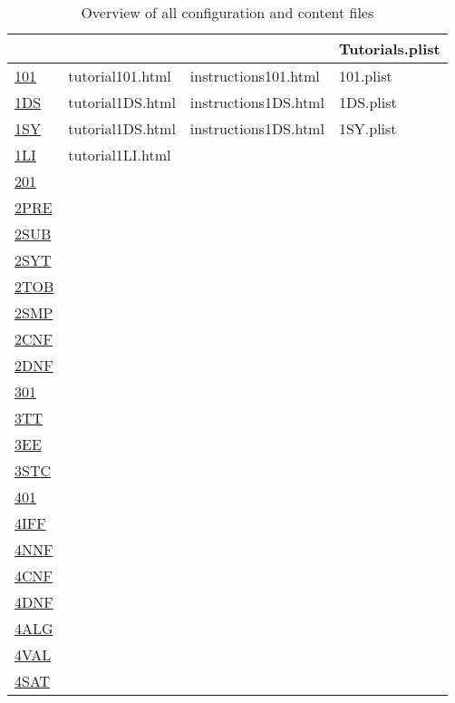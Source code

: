 \begin{table}[htdp]
\begin{center}
\begin{tabular}{llll}
&&&Tutorials.plist \\
\hline
\hline
\hyperref[tut:101]{101} & tutorial101.html & instructions101.html & 101.plist \\
\hyperref[tut:1DS]{1DS} & tutorial1DS.html & instructions1DS.html & 1DS.plist \\
\hyperref[tut:1SY]{1SY} & tutorial1DS.html & instructions1DS.html & 1SY.plist \\
\hyperref[tut:1LI]{1LI} & tutorial1LI.html & & \\
\hline
\hyperref[tut:201]{201} & \\
\hyperref[tut:2PRE]{2PRE} & \\
\hyperref[tut:2SUB]{2SUB} & \\
\hyperref[tut:2SYT]{2SYT} & \\
\hyperref[tut:2TOB]{2TOB} & \\
\hyperref[tut:2SMP]{2SMP} & \\
\hyperref[tut:2CNF]{2CNF} & \\
\hyperref[tut:2DNF]{2DNF} & \\
\hline
\hyperref[tut:301]{301} & \\
\hyperref[tut:3TT]{3TT} & \\
\hyperref[tut:3EE]{3EE} & \\
\hyperref[tut:3STC]{3STC} & \\
\hline
\hyperref[tut:401]{401} & \\
\hyperref[tut:4IFF]{4IFF} & \\
\hyperref[tut:4NNF]{4NNF} & \\
\hyperref[tut:4CNF]{4CNF} & \\
\hyperref[tut:4DNF]{4DNF} & \\
\hyperref[tut:4ALG]{4ALG} & \\
\hyperref[tut:4VAL]{4VAL} & \\
\hyperref[tut:4SAT]{4SAT} & \\
\hline
\end{tabular}
\caption{Overview of all configuration and content files}
\label{tab:CONFIG}
\end{center}
\end{table}%
